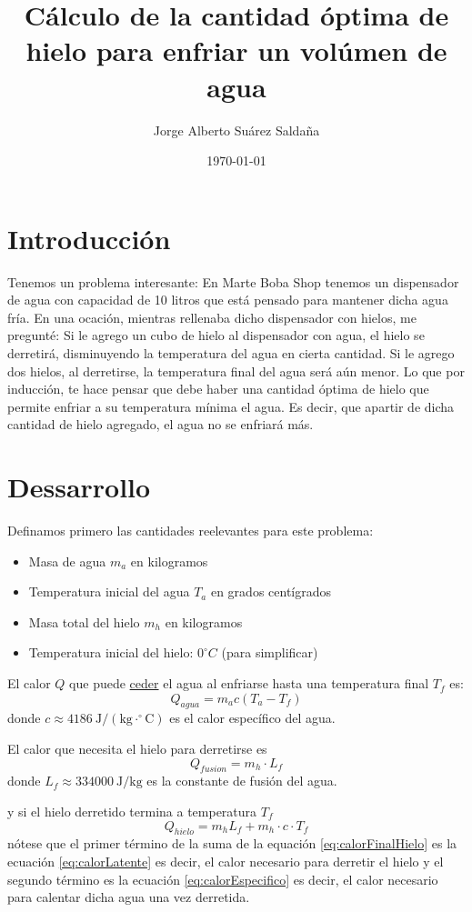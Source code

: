\documentclass[12pt]{article}
\title{Cálculo de la cantidad óptima de hielo para enfriar un volúmen de agua}
\author{Jorge Alberto Suárez Saldaña}
\date{\today}
\begin{document}
\maketitle
\section{Introducción}
Tenemos un problema interesante: En Marte Boba Shop tenemos un dispensador de agua con capacidad de 10 litros que está
pensado para mantener dicha agua fría.
En una ocación, mientras rellenaba dicho dispensador con hielos, me pregunté: 
Si le agrego un cubo de hielo al dispensador con agua, el hielo se derretirá, disminuyendo la temperatura del agua en cierta cantidad.
Si le agrego dos hielos, al derretirse, la temperatura final del agua será aún menor.
Lo que por inducción, te hace pensar que debe haber una cantidad óptima de hielo que permite enfriar a su temperatura mínima el agua.
Es decir, que apartir de dicha cantidad de hielo agregado, el agua no se enfriará más.
\section{Dessarrollo}
Definamos primero las cantidades reelevantes para este problema:
\begin{itemize}
  \item Masa de agua $m_a$ en kilogramos
  \item Temperatura inicial del agua $T_a$ en grados centígrados
  \item Masa total del hielo $m_h$ en kilogramos
  \item Temperatura inicial del hielo: $0^\circ C$ (para simplificar)
\end{itemize}
El calor $Q$ que puede \underline{ceder} el agua al enfriarse hasta una temperatura final $T_f$ es:
\begin{equation}
  Q_{agua} = m_a c (T_a - T_f)
  \label{eq:calorEspecifico}
\end{equation}
donde $c \approx 4186\ \mathrm{J/(kg\cdot^\circ C)}$ es el calor específico del agua.

El calor que necesita el hielo para derretirse es 
\begin{equation}
  Q_{fusion} = m_h \cdot L_f
  \label{eq:calorLatente}
\end{equation}
donde $L_f \approx 334000\ \mathrm{J/kg}$ es la constante de fusión del agua.

y si el hielo derretido termina a temperatura $T_f$
\begin{equation}
  Q_{hielo} = m_h L_f + m_h\cdot c \cdot T_f
  \label{eq:calorFinalHielo}
\end{equation}
nótese que el primer término de la suma de la equación \eqref{eq:calorFinalHielo} es la ecuación \eqref{eq:calorLatente} es decir, el calor necesario
para derretir el hielo y el segundo término es la ecuación \eqref{eq:calorEspecifico} es decir, el calor necesario para calentar dicha agua una vez derretida.
\end{document}
